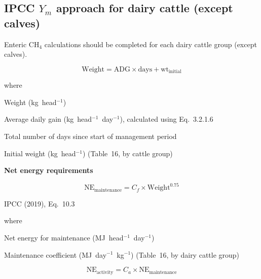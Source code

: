 \subsection{IPCC \texorpdfstring{$Y_m$}{Ym} approach for dairy cattle (except calves)}
\label{subsec:dairy-ym}

Enteric CH$_4$ calculations should be completed for each dairy cattle group (except calves).

\begin{equation}
    \mathrm{Weight} = \mathrm{ADG} \times \mathrm{days} + \mathrm{wt}_{\mathrm{initial}}
    \tag{Eq.\ 3.2.1.1}
\end{equation}

\noindent where
\begin{description}[font=\normalfont, leftmargin=9em, style=sameline, nosep]
    \item[$\mathrm{Weight}$] Weight (kg~head$^{-1}$)
    \item[$\mathrm{ADG}$] Average daily gain (kg~head$^{-1}$~day$^{-1}$), calculated
          using Eq.~3.2.1.6
    \item[$\mathrm{days}$] Total number of days since start of management period
    \item[$\mathrm{wt}_{\mathrm{initial}}$] Initial weight (kg~head$^{-1}$) (Table~16,
          by cattle group)
\end{description}

\bigskip
\noindent\textbf{Net energy requirements}

\begin{equation}
    \mathrm{NE}_{\mathrm{maintenance}} = C_f \times \mathrm{Weight}^{0.75}
    \tag{Eq.\ 3.2.1.2}
\end{equation}

\noindent IPCC (2019), Eq.~10.3

\noindent where
\begin{description}[font=\normalfont, leftmargin=9em, style=sameline, nosep]
    \item[$\mathrm{NE}_{\mathrm{maintenance}}$] Net energy for maintenance
          (MJ~head$^{-1}$~day$^{-1}$)
    \item[$C_f$] Maintenance coefficient (MJ~day$^{-1}$~kg$^{-1}$) (Table~16,
          by dairy cattle group)
\end{description}

\begin{equation}
    \mathrm{NE}_{\mathrm{activity}} = C_a \times \mathrm{NE}_{\mathrm{maintenance}}
    \tag{Eq.\ 3.2.1.3}
\end{equation}

